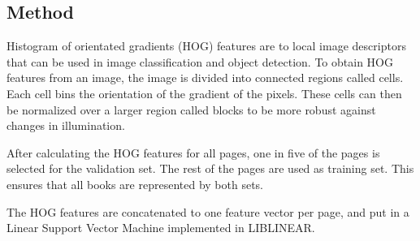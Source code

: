 \subsection{Method}
\label{subsec:pageclasmethod}
Histogram of orientated gradients (HOG) features are
to local image descriptors that can be used in image classification and object
detection\cite{dalal2005histograms}. To obtain HOG features from an image, the
image is divided into connected regions called cells. Each cell bins the
orientation of the gradient of the pixels. These cells can then be normalized
over a larger region called blocks to be more robust against changes in
illumination.


After calculating the HOG features for all pages, one in five of the pages is
selected for the validation set. The rest of the pages are used as training set.
This ensures that all books are represented by both sets. 

The HOG features are concatenated to one feature vector per page, and put in a
Linear Support Vector Machine\cite{boser1992training} implemented in 
LIBLINEAR\cite{fan2008liblinear}. 

